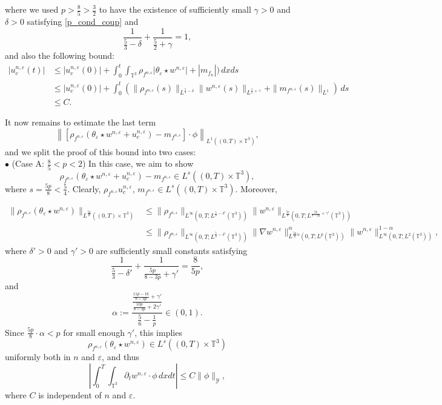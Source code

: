 \documentclass[10pt,reqno]{amsart}
\numberwithin{equation}{section}
\newcommand{\T}{\mathbb T}
\newcommand{\bq}{\begin{equation}}
\newcommand{\eq}{\end{equation}}
\newcommand{\e}{\varepsilon}
\newcommand{\lt}{\left}
\newcommand{\rt}{\right}
\newcommand{\intt}{\int_{\T^3}}
\begin{document}
where we used 
$p>\frac 85 >\frac 32$ to have the existence of sufficiently small $\gamma>0$ and $\delta>0$ satisfying \eqref{p_cond_coup} and
\bq\label{e_del_choice}
 \frac{1}{\frac 53 - \delta} + \frac{1}{\frac 52 +\gamma}=1,
\eq
and also the following bound:
\[\begin{aligned}
|u_c^{n,\e}(t)|&\le |u_c^{n,\e}(0)| +  \int_0^t \intt \rho_{f^{n,\e}} |\theta_\e\star  w^{n,\e}| + | m_{f_n}|)\,dxds\\
&\le |u_c^{n,\e}(0)| + \int_0^t (\|\rho_{f^{n,\e}}(s)\|_{L^{\frac 53 -\delta}}\|w^{n,\e}(s)\|_{L^{\frac 52 +\gamma}} + \|m_{f^{n,\e}}(s)\|_{L^1})\,ds\\
&\le C.
\end{aligned}\]

It now remains to estimate the last term 
\[
\lt\| [\rho_{f^{n,\e}} (\theta_\e \star  w^{n,\e}+u_c^{n,\e})-m_{f^{n,\e}}] \cdot \phi \rt\|_{L^1((0,T)\times\T^3)},
\] 
and we split the proof of this bound into two cases:\\

\noindent $\bullet$ (Case A: $\frac 85 < p<2$) In this case, we aim to show 
\[
\rho_{f^{n,\e}} (\theta_\e \star  w^{n,\e}+u_c^{n,\e})-m_{f^{n,\e}} \in L^s((0,T)\times\T^3),
\]
where $s = \frac{5p}{8} < \frac 54$. Clearly, $\rho_{f^{n,\e}} u_c^{n,\e}$, $m_{f^{n,\e}} \in L^s((0,T)\times\T^3)$. Moreover,

\[\begin{aligned}
\|\rho_{f^{n,\e}} (\theta_\e \star  w^{n,\e})\|_{L^{\frac{5p}{8}}((0,T)\times\T^3)} &\le \|\rho_{f^{n,\e}}\|_{L^\infty(0,T;L^{\frac53 -\delta'}(\T^3))}\|w^{n,\e}\|_{L^{\frac{5p}{8}}(0,T;L^{\frac{5p}{8-3p} +\gamma'}(\T^3)) }\\
&\le \|\rho_{f^{n,\e}}\|_{L^\infty(0,T;L^{\frac53 -\delta'}(\T^3))}\|\nabla w^{n,\e}\|_{L^{\frac{5p}{8}\alpha}(0,T;L^p(\T^3)) }^\alpha \|w^{n,\e}\|_{L^\infty(0,T;L^2(\T^3))}^{1-\alpha}, 
\end{aligned}\]
where $\delta'>0$ and $\gamma'>0$ are sufficiently small constants satisfying
\[
\frac{1}{\frac53-\delta'} + \frac{1}{\frac{5p}{8-3p}+\gamma'} = \frac{8}{5p},
\]
and
\[
\alpha :=\frac{\frac{\frac{11p-16}{8-3p}+\gamma'}{\frac{10p}{8-3p}+2\gamma' }}{\frac56 -\frac1p} \in (0,1).
\]
Since $\frac{5p}{8}\cdot \alpha <p$ for small enough $\gamma'$,  this implies 
\[
\rho_{f^{n,\e}} (\theta_\e \star  w^{n,\e}) \in L^s((0,T)\times\T^3) 
\]
uniformly both in $n$ and $\e$, and thus
\[
\left| \int_0^T \int_{\T^3} \partial_t w^{n,\e} \cdot \phi\,dxdt \right| \le C \|\phi\|_{\mathcal{Y}},
\]
where $C$ is independent of $n$ and $\e$.\\
\end{document}
